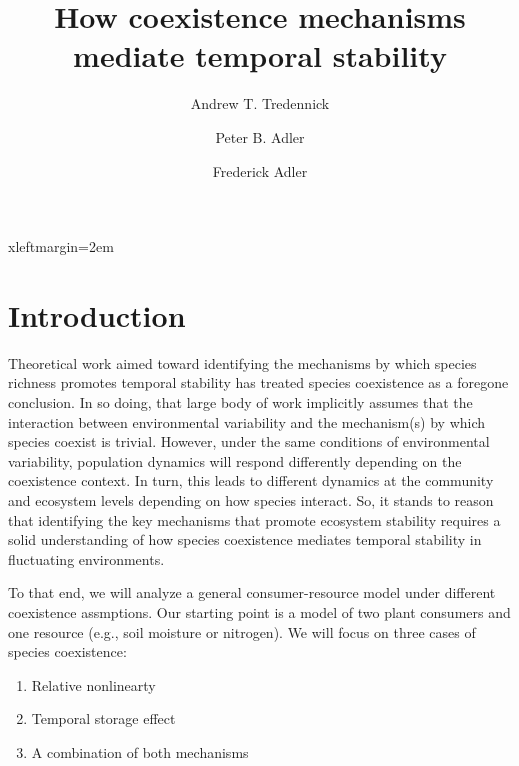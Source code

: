 \documentclass[12pt]{article}
\begin{document}



 {xleftmargin=2em}

\title{\LARGE How coexistence mechanisms mediate temporal stability}
\author[1]{\large Andrew T. Tredennick}
\author[1]{\large Peter B. Adler}
\author[2]{\large Frederick Adler}
\maketitle

\section{\large Introduction}
Theoretical work aimed toward identifying the mechanisms by which species richness promotes temporal stability has treated species coexistence as a foregone conclusion. In so doing, that large body of work implicitly assumes that the interaction between environmental variability and the mechanism(s) by which species coexist is trivial. However, under the same conditions of environmental variability, population dynamics will respond differently depending on the coexistence context. In turn, this leads to different dynamics at the community and ecosystem levels depending on how species interact. So, it stands to reason that identifying the key mechanisms that promote ecosystem stability requires a solid understanding of how species coexistence mediates temporal stability in fluctuating environments.

To that end, we will analyze a general consumer-resource model under different coexistence assmptions. Our starting point is a model of two plant consumers and one resource (e.g., soil moisture or nitrogen). We will focus on three cases of species coexistence:
\begin{enumerate}
  \item Relative nonlinearty
  \item Temporal storage effect
  \item A combination of both mechanisms
\end{enumerate}
\end{document}
